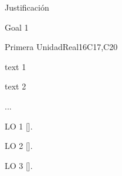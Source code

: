 \begin{syllabus}


\begin{justification}
Justificación 
\end{justification}

\begin{goals}
\item Goal 1
\end{goals}

\begin{outcomes}
   \item {}
   \item {}
   \item {}
\end{outcomes}

\begin{competences}
    \item {}
    \item {}
    \item {}
\end{competences}

\begin{unit}{Primera Unidad}{}{Real}{16}{C17,C20}
\begin{topics}
      \item text 1
      \item text 2
      \item ...
\end{topics}

\begin{learningoutcomes}
   \item LO 1 [\Usage].
   \item LO 2 [\Usage].
   \item LO 3 [\Usage].
\end{learningoutcomes}
\end{unit}



\begin{coursebibliography}
\end{coursebibliography}

\end{syllabus}